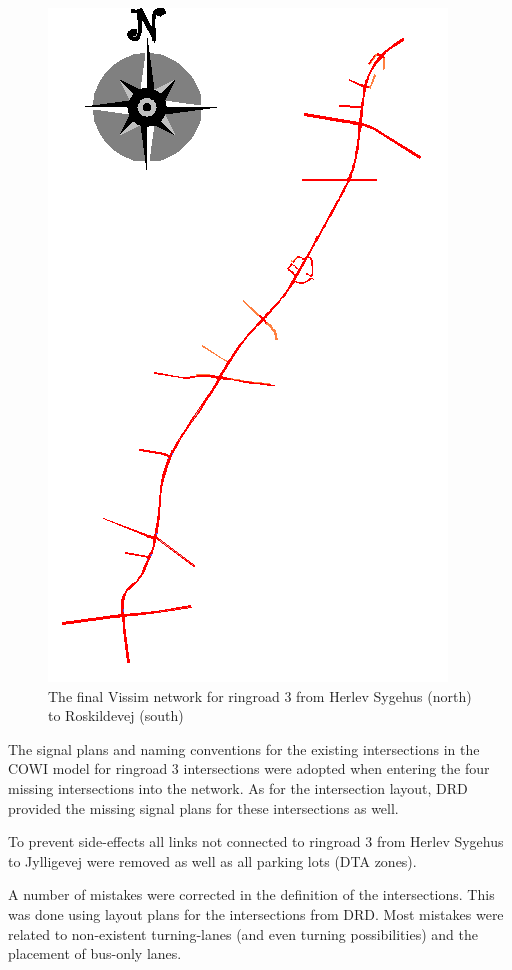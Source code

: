 \begin{figure}[htbp]
\centering
\includegraphics[scale=0.4]{vissimnetwork.png} 
\caption{The final Vissim network for ringroad 3 from Herlev Sygehus (north) to Roskildevej (south)}
\label{fig:vissimnetwork}
\end{figure}

The signal plans and naming conventions for the existing intersections in the COWI model for ringroad 3 intersections were adopted when entering the four missing intersections into the network. As for the intersection layout, DRD provided the missing signal plans for these intersections as well.

To prevent side-effects all links not connected to ringroad 3 from Herlev Sygehus to Jylligevej were removed as well as all parking lots (DTA zones).

A number of mistakes were corrected in the definition of the intersections. This was done using layout plans for the intersections from DRD. Most mistakes were related to non-existent turning-lanes (and even turning possibilities) and the placement of bus-only lanes. 


